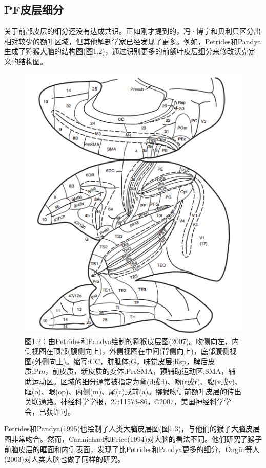 \subsection{PF皮层细分}
关于前部皮层的细分还没有达成共识。正如刚才提到的，冯·博宁和贝利只区分出相对较少的额叶区域，但其他解剖学家已经发现了更多。例如，Petrides和Pandya生成了猕猴大脑的结构图(图1.2)，通过识别更多的前额叶皮层细分来修改沃克定义的结构图。


\begin{figure}[!htb]
	\centering
	\includegraphics[width=0.5\linewidth]{image_pfc/Fig_1_2}
	\caption*{图1.2：由Petrides和Pandya绘制的猕猴皮层图(2007)。吻侧向左，内侧视图在顶部(腹侧向上)，外侧视图在中间(背侧向上)，底部腹侧视图(外侧向上)。缩写:CC，胼胝体;G，味觉皮层;Rsp，脾后皮质;Pro，前皮质，新皮质的变体;PreSMA，预辅助运动区;SMA，辅助运动区。区域的细分通常被指定为背(d或d)、吻(r或r)、腹(v或v)、眶(o)、眼(op)、内侧(m)、尾(c)或前(a)。猕猴吻侧前额叶皮层的传出关联通路。神经科学学报，27:11573-86，©2007，美国神经科学学会，已获许可。}
\end{figure}


\par
Petrides和Pandya(1995)也绘制了人类大脑皮层图(图1.3)，与他们的猴子大脑皮层图非常吻合。然而，Carmichael和Price(1994)对大脑的看法不同。他们研究了猴子前脑皮层的眶面和内侧表面，发现了比Petrides和Pandya更多的细分，Öngür等人(2003)对人类大脑也做了同样的研究。

